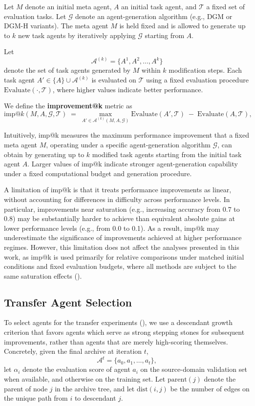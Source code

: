 \documentclass{article}
\begin{document}
Let $M$ denote an initial meta agent, $A$ an initial task agent, and $\mathcal{T}$ a fixed set of evaluation tasks. Let $\mathcal{G}$ denote an agent-generation algorithm (e.g., DGM or DGM-H variants). The meta agent $M$ is held fixed and is allowed to generate up to $k$ new task agents by iteratively applying $\mathcal{G}$ starting from $A$.

Let
\[
\mathcal{A}^{(k)} = \{A^{1}, A^{2}, \dots, A^{k}\}
\]
denote the set of task agents generated by $M$ within $k$ modification steps. Each task agent
$A' \in \{A\} \cup \mathcal{A}^{(k)}$ is evaluated on $\mathcal{T}$ using a fixed evaluation
procedure $\mathrm{Evaluate}(\cdot, \mathcal{T})$, where higher values indicate better performance.

We define the \textbf{improvement@k} metric as
\[
\mathrm{imp@}k(M, A, \mathcal{G}, \mathcal{T})
\;=\;
\max_{A' \in \mathcal{A}^{(k)}(M, A, \mathcal{G})}
\mathrm{Evaluate}(A', \mathcal{T})
\;-\;
\mathrm{Evaluate}(A, \mathcal{T}),
\]

Intuitively, imp@k measures the maximum performance improvement that a fixed meta agent $M$, operating under a specific agent-generation algorithm $\mathcal{G}$, can obtain by generating up to $k$ modified task agents starting from the initial task agent $A$. Larger values of imp@k indicate stronger agent-generation capability under a fixed computational budget and generation procedure.

A limitation of imp@k is that it treats performance improvements as linear, without accounting for differences in difficulty across performance levels. In particular, improvements near saturation (e.g., increasing accuracy from 0.7 to 0.8) may be substantially harder to achieve than equivalent absolute gains at lower performance levels (e.g., from 0.0 to 0.1). As a result, imp@k may underestimate the significance of improvements achieved at higher performance regimes. However, this limitation does not affect the analyses presented in this work, as imp@k is used primarily for relative comparisons under matched initial conditions and fixed evaluation budgets, where all methods are subject to the same saturation effects ().

\subsection{Transfer Agent Selection}
\label{app:transfer-selection}

To select agents for the transfer experiments (), we use a descendant growth criterion that favors agents which serve as strong stepping stones for subsequent improvements, rather than agents that are merely high-scoring themselves.
Concretely, given the final archive at iteration \(t\),
\[
\mathcal{A}^t = \{a_0, a_1, \dots, a_t\},
\]
let \(\alpha_i\) denote the evaluation score of agent \(a_i\) on the source-domain validation set when available, and otherwise on the training set.
Let \(\mathrm{parent}(j)\) denote the parent of node \(j\) in the archive tree, and let \(\mathrm{dist}(i,j)\) be the number of edges on the unique path from \(i\) to descendant \(j\).
\end{document}
